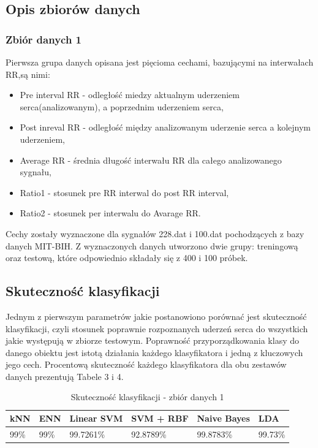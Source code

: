 \documentclass[[10pt,a4paper]{article}
\begin{document}
\subsection{Opis zbiorów danych}
\subsubsection{Zbiór danych 1}
Pierwsza grupa danych opisana jest pięcioma cechami, bazującymi na interwałach RR,są nimi:
\begin{itemize}
\item Pre interval RR - odległość miedzy aktualnym uderzeniem serca(analizowanym), a poprzednim uderzeniem serca,
\item Post inreval RR  - odległość między analizowanym uderzenie serca a kolejnym uderzeniem,
\item Average RR - średnia długość interwału RR dla całego analizowanego sygnału,
\item Ratio1 - stosunek pre RR interwal do post RR interval,
\item Ratio2 - stosunek per interwalu do Avarage RR.
\end{itemize}

Cechy zostały wyznaczone dla sygnałów 228.dat i 100.dat pochodzących z bazy danych MIT-BIH. Z wyznaczonych danych utworzono dwie grupy: treningową oraz testową, które odpowiednio składały się z 400 i 100 próbek. 


\subsection{Skuteczność klasyfikacji}

Jednym z pierwszym parametrów jakie postanowiono porównać jest skuteczność klasyfikacji, czyli stosunek poprawnie rozpoznanych uderzeń serca do wszystkich jakie występują w zbiorze testowym. Poprawność przyporządkowania klasy do danego obiektu jest istotą działania każdego klasyfikatora i jedną z kluczowych jego cech. Procentową skuteczność każdego klasyfikatora  dla obu zestawów danych prezentują Tabele 3 i 4.

\begin{table}[h]
\centering
\caption{Skuteczność klasyfikacji - zbiór danych 1}
\label{accuracyTable2}
\begin{tabular}{|l|l|l|l|l|l|}
\hline
kNN & ENN & Linear SVM & SVM + RBF & Naive Bayes & LDA \\ \hline
  99\%   &  99\%  & 99.7261\%       & 92.8789\%      & 99.8783\%        & 99.73\%  \\ \hline
\end{tabular}
\end{table}
\end{document}
